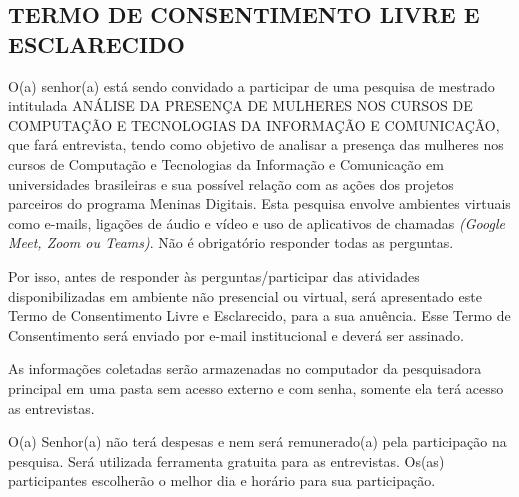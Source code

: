

\begin{apendicesenv}




\chapter{TERMO DE CONSENTIMENTO LIVRE E ESCLARECIDO}\label{ap:Termo}

O(a) senhor(a) está sendo convidado a participar de uma pesquisa de mestrado intitulada ANÁLISE DA PRESENÇA DE MULHERES NOS CURSOS DE COMPUTAÇÃO E TECNOLOGIAS DA INFORMAÇÃO E COMUNICAÇÃO, que fará entrevista, tendo como objetivo de analisar a presença das mulheres nos cursos de Computação e Tecnologias da Informação e Comunicação em universidades brasileiras e sua possível relação com as ações dos projetos parceiros do programa Meninas Digitais. Esta pesquisa envolve ambientes virtuais como e-mails, ligações de áudio e vídeo e uso de aplicativos de chamadas \textit{(Google Meet, Zoom ou Teams)}. Não é obrigatório responder todas as perguntas.

Por isso, antes de responder às perguntas/participar das atividades disponibilizadas em ambiente não presencial ou virtual, será apresentado este Termo de Consentimento Livre e Esclarecido, para a sua anuência. Esse Termo de Consentimento será enviado por e-mail institucional e deverá ser assinado. 

As informações coletadas serão armazenadas no computador da pesquisadora principal em uma pasta sem acesso externo e com senha, somente ela terá acesso as entrevistas.

O(a) Senhor(a) não terá despesas e nem será remunerado(a) pela participação na pesquisa. Será utilizada ferramenta gratuita para as entrevistas. Os(as) participantes escolherão o melhor dia e horário para sua participação. 


\end{apendicesenv}
